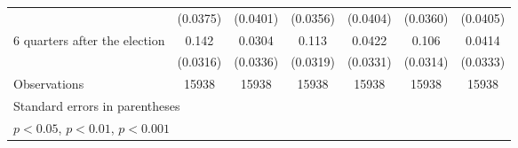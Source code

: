 \begin{table}[htbp]
\begin{tabular}{l*{6}{c}}
                    &    (0.0375)         &    (0.0401)         &    (0.0356)         &    (0.0404)         &    (0.0360)         &    (0.0405)         \\
[1em]
 6 quarters after the election&       0.142\sym{***}&      0.0304         &       0.113\sym{***}&      0.0422         &       0.106\sym{***}&      0.0414         \\
                    &    (0.0316)         &    (0.0336)         &    (0.0319)         &    (0.0331)         &    (0.0314)         &    (0.0333)         \\
\hline
Observations        &       15938         &       15938         &       15938         &       15938         &       15938         &       15938         \\
\hline\hline
\multicolumn{7}{l}{\footnotesize Standard errors in parentheses}\\
\multicolumn{7}{l}{\footnotesize \sym{*} \(p<0.05\), \sym{**} \(p<0.01\), \sym{***} \(p<0.001\)}\\
\end{tabular}
\end{table}
